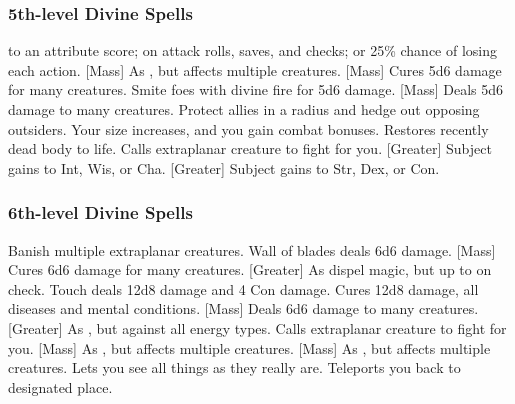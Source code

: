 \subsubsection{5th-level Divine Spells}
\begin{spelllist}
      to an attribute score;  on attack rolls, saves, and checks; or 25\% chance of losing each action.
    [Mass] As , but affects multiple creatures.
    [Mass] Cures 5d6 damage for many creatures.
     Smite foes with divine fire for 5d6 damage.
    [Mass] Deals 5d6 damage to many creatures.
     Protect allies in a \areamed radius and hedge out opposing outsiders.
     Your size increases, and you gain combat bonuses.
     Restores recently dead body to life.
     Calls extraplanar creature to fight for you.
    [Greater] Subject gains  to Int, Wis, or Cha.
    [Greater] Subject gains  to Str, Dex, or Con.
\end{spelllist}

\subsubsection{6th-level Divine Spells}
\begin{spelllist}
     Banish multiple extraplanar creatures. 
     Wall of blades deals 6d6 damage.
    [Mass] Cures 6d6 damage for many creatures.
    [Greater] As dispel magic, but up to  on check.
     Touch deals 12d8 damage and 4 Con damage.
     Cures 12d8 damage, all diseases and mental conditions.
    [Mass] Deals 6d6 damage to many creatures.
    [Greater] As , but against all energy types.
     Calls extraplanar creature to fight for you.
    [Mass] As , but affects multiple creatures.
    [Mass] As , but affects multiple creatures.
    \M Lets you see all things as they really are.
     Teleports you back to designated place.
\end{spelllist}

